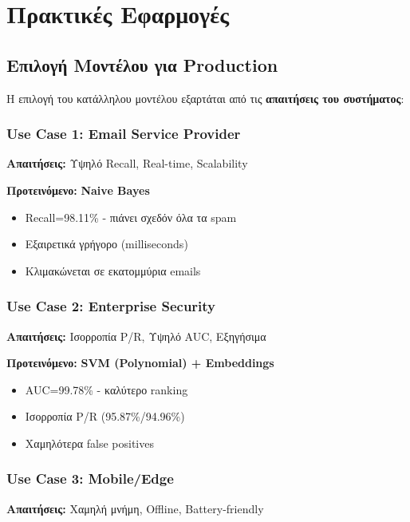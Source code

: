 \documentclass[12pt,a4paper,twoside]{book}
\begin{document}
\section{Πρακτικές Εφαρμογές}

\subsection{Επιλογή Μοντέλου για Production}

Η επιλογή του κατάλληλου μοντέλου εξαρτάται από τις \textbf{απαιτήσεις του συστήματος}:

\subsubsection{Use Case 1: Email Service Provider}

\textbf{Απαιτήσεις:} Υψηλό Recall, Real-time, Scalability

\textbf{Προτεινόμενο:} \textbf{Naive Bayes}
\begin{itemize}
    \item \checkmark Recall=98.11\% - πιάνει σχεδόν όλα τα spam
    \item \checkmark Εξαιρετικά γρήγορο (milliseconds)
    \item \checkmark Κλιμακώνεται σε εκατομμύρια emails
\end{itemize}

\subsubsection{Use Case 2: Enterprise Security}

\textbf{Απαιτήσεις:} Ισορροπία P/R, Υψηλό AUC, Εξηγήσιμα

\textbf{Προτεινόμενο:} \textbf{SVM (Polynomial) + Embeddings}
\begin{itemize}
    \item \checkmark AUC=99.78\% - καλύτερο ranking
    \item \checkmark Ισορροπία P/R (95.87\%/94.96\%)
    \item \checkmark Χαμηλότερα false positives
\end{itemize}

\subsubsection{Use Case 3: Mobile/Edge}

\textbf{Απαιτήσεις:} Χαμηλή μνήμη, Offline, Battery-friendly
\end{document}
